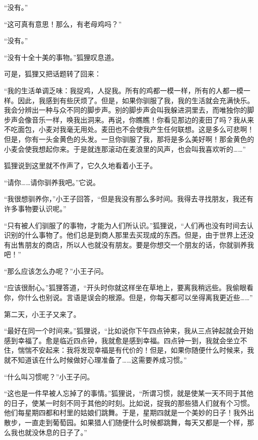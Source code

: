 “没有。”

“这可真有意思！那么，有老母鸡吗？”

“没有。”

“没有十全十美的事物。”狐狸叹息道。

可是，狐狸又把话题转了回来：

“我的生活单调乏味：我捉鸡，人捉我。所有的鸡都一模一样，所有的人都一模一样。因此，我感到有些厌烦了。但是，如果你驯服了我，我的生活就会充满快乐。我会分辨出一种与众不同的脚步声。别的脚步声会叫我躲进洞里去，而唯独你的脚步声会像音乐一样，唤我出洞来。再说，你瞧瞧！你看见那边的麦田了吗？我从来不吃面包，小麦对我毫无用处。麦田也不会使我产生任何联想。这是多么可悲啊！但是，你有一头金黄色的头发。一旦你驯服了我，那将是多么美好啊！那金黄色的小麦会使我想起你来。于是就连那滚动在麦浪里的风声，也会叫我喜欢听的\ldots{}\ldots{}”

狐狸说到这里就不作声了，它久久地看着小王子。

“请你\ldots{}\ldots{}请你驯养我吧。”它说。

“我很想驯养你，”小王子回答，“但是我没有那么多时间。我得去寻找朋友，我还有许多事物要认识呢。”

“只有被人们驯服了的事物，才能为人们所认识。”狐狸说，“人们再也没有时间去认识别的什么事物了。他们总是到商人那里去买现成的东西。但是，由于世界上还没有出售朋友的商店，所以人也就没有朋友。要是你想交一个朋友的话，你就驯养我吧！”

“那么应该怎么办呢？”小王子问。

“应该很耐心。”狐狸答道，“开头时你就这样坐在草地上，要离我稍远些。我偷眼看你，你什么也别说。言语是误会的根源。但是，你每天都可以坐得离我更近些\ldots{}\ldots{}”

第二天，小王子又来了。

“最好在同一个时间来。”狐狸说，“比如说你下午四点钟来，我从三点钟起就会开始感到幸福了。愈是临近四点钟，我就愈是感到幸福。四点钟一到，我就会坐立不住，惴惴不安起来：我将发现幸福是有代价的！但是，如果你随便什么时候来，我就不知道该在什么时候做好心理准备了\ldots{}\ldots{}这需要养成习惯。”

{\startalignment[center]
 \stopalignment}

“什么叫习惯呢？”小王子问。

“这也是一件早被人忘掉了的事情。”狐狸说，“所谓习惯，就是使某一天不同于其他的日子，使某一时刻不同于其他的时刻。比如说，捉我的那些猎人们就有个习惯。他们每星期四都和村里的姑娘们跳舞。于是，星期四就是一个美妙的日子！我外出散步，一直走到葡萄园。如果猎人们随便什么时候都跳舞，每天又都是一个样，那么我也就没休息的日子了。”

